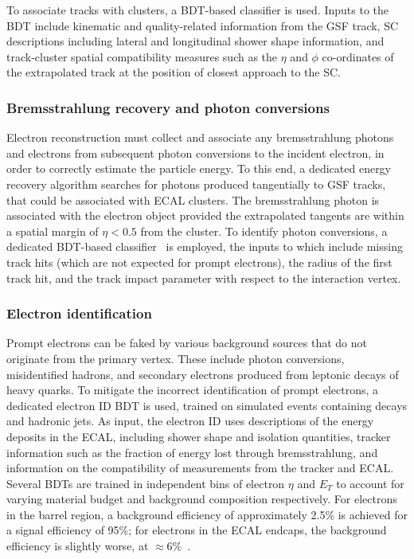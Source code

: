To associate tracks with clusters, a BDT-based classifier is used. Inputs to the BDT include kinematic and quality-related information from the GSF track, SC descriptions including lateral and longitudinal shower shape information, and track-cluster spatial compatibility measures such as the $\eta$ and $\phi$ co-ordinates of the extrapolated track at the position of closest approach to the SC.


\subsubsection{Bremsstrahlung recovery and photon conversions}

Electron reconstruction must collect and associate any bremsstrahlung photons and electrons from subsequent photon conversions to the incident electron, in order to correctly estimate the particle energy. To this end, a dedicated energy recovery algorithm searches for photons produced tangentially to GSF tracks, that could be associated with ECAL clusters. The bremsstrahlung photon is associated with the electron object provided the extrapolated tangents are within a spatial margin of $\eta<0.5$ from the cluster. To identify photon conversions, a dedicated BDT-based classifier~\cite{photon_conversion_finder} is employed, the inputs to which include missing track hits (which are not expected for prompt electrons), the radius of the first track hit, and the track impact parameter with respect to the interaction vertex. 



\subsubsection{Electron identification}   
Prompt electrons can be faked by various background sources that do not originate from the primary vertex. These include photon conversions, misidentified hadrons, and secondary electrons produced from leptonic decays of heavy quarks. To mitigate the incorrect identification of prompt electrons, a dedicated electron ID BDT is used, trained on simulated events containing \Zee decays and hadronic jets. As input, the electron ID uses descriptions of the energy deposits in the ECAL, including shower shape and isolation quantities, tracker information such as the fraction of energy lost through bremsstrahlung, and information on the compatibility of measurements from the tracker and ECAL. Several BDTs are trained in independent bins of electron $\eta$ and $E_{T}$ to account for varying material budget and background composition respectively. For electrons in the barrel region, a background efficiency of approximately 2.5\% is achieved for a signal efficiency of 95\%; for electrons in the ECAL endcaps, the background efficiency is slightly worse, at ${\approx}6\%$~\cite{CMS_egamma_performance}.

